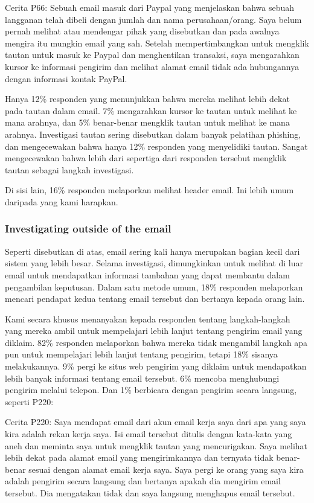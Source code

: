 \documentclass[lettersize,journal]{IEEEtran}
\begin{document}
Cerita P66: Sebuah email masuk dari Paypal yang menjelaskan bahwa sebuah
langganan telah dibeli dengan jumlah dan nama perusahaan/orang. Saya belum
pernah melihat atau mendengar pihak yang disebutkan dan pada awalnya mengira
itu mungkin email yang sah. Setelah mempertimbangkan untuk mengklik tautan
untuk masuk ke Paypal dan menghentikan transaksi, saya mengarahkan kursor ke
informasi pengirim dan melihat alamat email tidak ada hubungannya dengan
informasi kontak PayPal.

Hanya 12\% responden yang menunjukkan bahwa mereka melihat lebih dekat pada
tautan dalam email. 7\% mengarahkan kursor ke tautan untuk melihat ke mana
arahnya, dan 5\% benar-benar mengklik tautan untuk melihat ke mana arahnya.
Investigasi tautan sering disebutkan dalam banyak pelatihan phishing, dan
mengecewakan bahwa hanya 12\% responden yang menyelidiki tautan. Sangat
mengecewakan bahwa lebih dari sepertiga dari responden tersebut mengklik tautan
sebagai langkah investigasi.

Di sisi lain, 16\% responden melaporkan melihat header email. Ini lebih umum
daripada yang kami harapkan.

\subsubsection{Investigating outside of the email}

Seperti disebutkan di atas, email sering kali hanya merupakan bagian kecil dari
sistem yang lebih besar. Selama investigasi, dimungkinkan untuk melihat di luar
email untuk mendapatkan informasi tambahan yang dapat membantu dalam
pengambilan keputusan. Dalam satu metode umum, 18\% responden melaporkan
mencari pendapat kedua tentang email tersebut dan bertanya kepada orang lain.

Kami secara khusus menanyakan kepada responden tentang langkah-langkah yang
mereka ambil untuk mempelajari lebih lanjut tentang pengirim email yang
diklaim. 82\% responden melaporkan bahwa mereka tidak mengambil langkah apa pun
untuk mempelajari lebih lanjut tentang pengirim, tetapi 18\% sisanya
melakukannya. 9\% pergi ke situs web pengirim yang diklaim untuk mendapatkan
lebih banyak informasi tentang email tersebut. 6\% mencoba menghubungi pengirim
melalui telepon. Dan 1\% berbicara dengan pengirim secara langsung, seperti
P220:

Cerita P220: Saya mendapat email dari akun email kerja saya dari apa yang saya
kira adalah rekan kerja saya. Isi email tersebut ditulis dengan kata-kata yang
aneh dan meminta saya untuk mengklik tautan yang mencurigakan. Saya melihat
lebih dekat pada alamat email yang mengirimkannya dan ternyata tidak
benar-benar sesuai dengan alamat email kerja saya. Saya pergi ke orang yang
saya kira adalah pengirim secara langsung dan bertanya apakah dia mengirim
email tersebut. Dia mengatakan tidak dan saya langsung menghapus email
tersebut.
\end{document}
